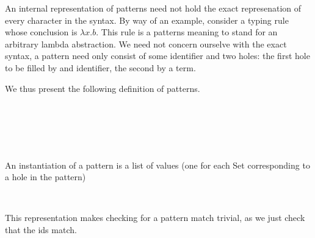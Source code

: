 An internal representation of patterns need not hold the exact represenation
of every character in the syntax. By way of an example, consider a typing
rule whose conclusion is $λx.b$. This rule is a patterns meaning to stand
for an arbitrary lambda abstraction. We need not concern ourselve with the
exact syntax, a pattern need only consist of some identifier and two holes:
the first hole to be filled by and identifier, the second by a term.

We thus present the following definition of patterns.

\begin{code}%
\>[0]\AgdaSpace{}%
\AgdaSpace{}%
\AgdaSymbol{:}\AgdaSpace{}%
\AgdaSpace{}%
\<%
\\
\>[0][@{}l@{\AgdaIndent{0}}]%
\>[2]\AgdaSpace{}%
\AgdaOperator{\AgdaInductiveConstructor{\AgdaUnderscore{}\textasciitilde{}\AgdaUnderscore{}}}\<%
\\
%
\>[2]\<%
\\
\>[2][@{}l@{\AgdaIndent{0}}]%
\>[4]%
\>[10]\AgdaSymbol{:}\AgdaSpace{}%
\<%
\\
%
\>[4]\AgdaSpace{}%
\AgdaSymbol{:}\AgdaSpace{}%
\AgdaSpace{}%
\<%
\end{code}


An instantiation of a pattern is a list of values (one for each Set
corresponding to a hole in the pattern)

\begin{code}%
\>[0]\AgdaSpace{}%
\AgdaSymbol{:}\AgdaSpace{}%
\<%
\\
\>[0]\AgdaSpace{}%
\AgdaSymbol{=}\AgdaSpace{}%
\AgdaFunction{Σ[}\AgdaSpace{}%
\AgdaSpace{}%
\AgdaSpace{}%
\AgdaSpace{}%
\AgdaFunction{]}\AgdaSpace{}%
\AgdaSpace{}%
\AgdaSpace{}%
\AgdaSymbol{(}\AgdaSpace{}%
\AgdaSymbol{)}\<%
\end{code}

This representation makes checking for a pattern match trivial, as we
just check that the ids match.

